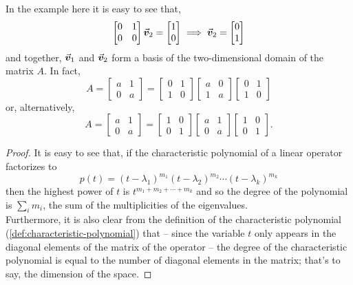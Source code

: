 \documentclass[../MathsNotesBase.tex]{subfiles}
\begin{document}
{		In the example here it is easy to see that,
		\[
			\begin{bmatrix}
				0 & 1\\
				0 & 0
			\end{bmatrix}\vec{\bm{v}}_2 = \begin{bmatrix}1\\ 0\end{bmatrix} \implies \vec{\bm{v}}_2 = \begin{bmatrix}0\\ 1\end{bmatrix}
		\]
		and together, $\vec{\bm{v}}_1$ and $\vec{\bm{v}}_2$ form a basis of the two-dimensional domain of the matrix $A$. In fact,
		\[
			A = \begin{bmatrix}
					a & 1\\
					0 & a
				\end{bmatrix} = 
				\begin{bmatrix}
					0 & 1\\
					1 & 0
				\end{bmatrix} 
				\begin{bmatrix}
					a & 0\\
					1 & a
				\end{bmatrix}
				\begin{bmatrix}
					0 & 1\\
					1 & 0
				\end{bmatrix} 
		\]
		or, alternatively,
		\[
			A = \begin{bmatrix}
					a & 1\\
					0 & a
				\end{bmatrix} = 
				\begin{bmatrix}
					1 & 0\\
					0 & 1
				\end{bmatrix} 
				\begin{bmatrix}
					a & 1\\
					0 & a
				\end{bmatrix}
				\begin{bmatrix}
					1 & 0\\
					0 & 1
				\end{bmatrix}.
		\]
		
		\biggerskip
		\begin{proof}
			It is easy to see that, if the characteristic polynomial of a linear operator factorizes to
			\[ p(t) = (t - \lambda_1)^{m_1}(t - \lambda_2)^{m_2}\cdots(t - \lambda_k)^{m_k} \]
			then the highest power of $t$ is ${ t^{m_1 + m_2 + \cdots + m_k} }$ and so the degree of the polynomial is ${ \sum_i m_i }$, the sum of the multiplicities of the eigenvalues.\\
			Furthermore, it is also clear from the definition of the characteristic polynomial (\ref{def:characteristic-polynomial}) that -- since the variable $t$ only appears in the diagonal elements of the matrix of the operator -- the degree of the characteristic polynomial is equal to the number of diagonal elements in the matrix; that's to say, the dimension of the space.
		\end{proof}
		
}
\end{document}
